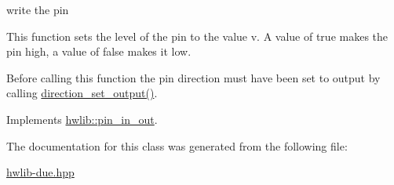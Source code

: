 write the pin 

This function sets the level of the pin to the value v. A value of true makes the pin high, a value of false makes it low.

Before calling this function the pin direction must have been set to output by calling \hyperlink{classdue_1_1pin__in__out_a45f7cf2e7f71638337f82ecf1852f884}{direction\+\_\+set\+\_\+output()}. 

Implements \hyperlink{classhwlib_1_1pin__in__out_a198c4d27a9783f4c17e8f5dfd9aca6a9}{hwlib\+::pin\+\_\+in\+\_\+out}.



The documentation for this class was generated from the following file\+:\begin{DoxyCompactItemize}
\item 
\hyperlink{hwlib-due_8hpp}{hwlib-\/due.\+hpp}\end{DoxyCompactItemize}
